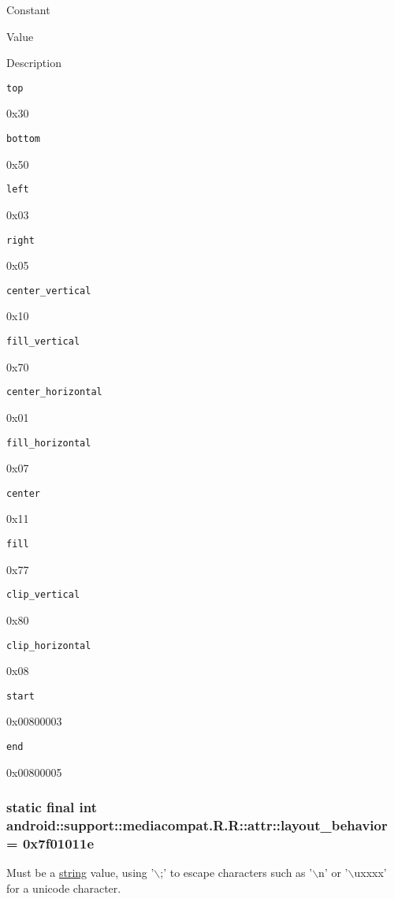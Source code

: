 Constant

Value

Description 

{\tt top}

0x30

{\tt bottom}

0x50

{\tt left}

0x03

{\tt right}

0x05

{\tt center\_\-vertical}

0x10

{\tt fill\_\-vertical}

0x70

{\tt center\_\-horizontal}

0x01

{\tt fill\_\-horizontal}

0x07

{\tt center}

0x11

{\tt fill}

0x77

{\tt clip\_\-vertical}

0x80

{\tt clip\_\-horizontal}

0x08

{\tt start}

0x00800003

{\tt end}

0x00800005\hypertarget{classandroid_1_1support_1_1mediacompat_1_1_r_1_1attr_c977eeccbd1dc3b001895758e9e6bec8}{
\subsubsection[{layout\_\-behavior}]{\setlength{\rightskip}{0pt plus 5cm}static final int android::support::mediacompat.R.R::attr::layout\_\-behavior = 0x7f01011e}}
\label{classandroid_1_1support_1_1mediacompat_1_1_r_1_1attr_c977eeccbd1dc3b001895758e9e6bec8}


Must be a \hyperlink{classandroid_1_1support_1_1mediacompat_1_1_r_1_1string}{string} value, using '$\backslash$;' to escape characters such as '$\backslash$n' or '$\backslash$uxxxx' for a unicode character. 

